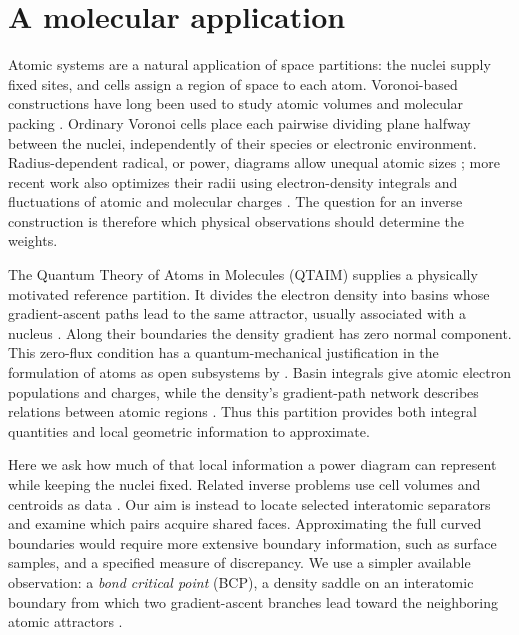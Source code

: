 \section{A molecular application}
\label{sec:molecular-application}
\label{subsec:numerical-molecular}

Atomic systems are a natural application of space partitions: the nuclei supply fixed sites, and cells assign a region of space to each atom. Voronoi-based constructions have long been used to study atomic volumes and molecular packing \citep{Richards1974}. Ordinary Voronoi cells place each pairwise dividing plane halfway between the nuclei, independently of their species or electronic environment. Radius-dependent radical, or power, diagrams allow unequal atomic sizes \citep{GellatlyFinney1982}; more recent work also optimizes their radii using electron-density integrals and fluctuations of atomic and molecular charges \citep{BrehmThomas2021}. The question for an inverse construction is therefore which physical observations should determine the weights.

The Quantum Theory of Atoms in Molecules (QTAIM) supplies a physically motivated reference partition. It divides the electron density into basins whose gradient-ascent paths lead to the same attractor, usually associated with a nucleus \citep{Bader1980,Bader1990}. Along their boundaries the density gradient has zero normal component. This zero-flux condition has a quantum-mechanical justification in the formulation of atoms as open subsystems by \citet{Bader1994}. Basin integrals give atomic electron populations and charges, while the density's gradient-path network describes relations between atomic regions \citep{Bader1990}. Thus this partition provides both integral quantities and local geometric information to approximate.

Here we ask how much of that local information a power diagram can represent while keeping the nuclei fixed. Related inverse problems use cell volumes and centroids as data \citep{BournePearceRoper2025}. Our aim is instead to locate selected interatomic separators and examine which pairs acquire shared faces. Approximating the full curved boundaries would require more extensive boundary information, such as surface samples, and a specified measure of discrepancy. We use a simpler available observation: a \emph{bond critical point} (BCP), a density saddle on an interatomic boundary from which two gradient-ascent branches lead toward the neighboring atomic attractors \citep{Bader1980}.

